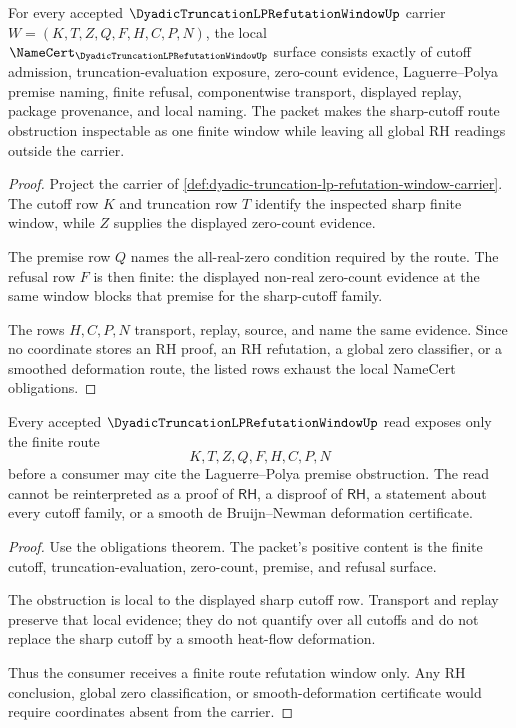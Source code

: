 \begin{theorem}
\label{thm:dyadic-truncation-lp-refutation-window-obligations}
For every accepted $\DyadicTruncationLPRefutationWindowUp$ carrier $W=(K,T,Z,Q,F,H,C,P,N)$, the local $\NameCert_{\DyadicTruncationLPRefutationWindowUp}$ surface consists exactly of cutoff admission, truncation-evaluation exposure, zero-count evidence, Laguerre--Polya premise naming, finite refusal, componentwise transport, displayed replay, package provenance, and local naming. The packet makes the sharp-cutoff route obstruction inspectable as one finite window while leaving all global RH readings outside the carrier.
\end{theorem}
\begin{proof}
Project the carrier of \autoref{def:dyadic-truncation-lp-refutation-window-carrier}. The cutoff row $K$ and truncation row $T$ identify the inspected sharp finite window, while $Z$ supplies the displayed zero-count evidence.

The premise row $Q$ names the all-real-zero condition required by the route. The refusal row $F$ is then finite: the displayed non-real zero-count evidence at the same window blocks that premise for the sharp-cutoff family.

The rows $H,C,P,N$ transport, replay, source, and name the same evidence. Since no coordinate stores an RH proof, an RH refutation, a global zero classifier, or a smoothed deformation route, the listed rows exhaust the local NameCert obligations.
\end{proof}

\begin{theorem}
\label{thm:dyadic-truncation-lp-refutation-window-nonclaim-boundary}
Every accepted $\DyadicTruncationLPRefutationWindowUp$ read exposes only the finite route
$$
K,T,Z,Q,F,H,C,P,N
$$
before a consumer may cite the Laguerre--Polya premise obstruction. The read cannot be reinterpreted as a proof of $\mathsf{RH}$, a disproof of $\mathsf{RH}$, a statement about every cutoff family, or a smooth de Bruijn--Newman deformation certificate.
\end{theorem}
\begin{proof}
Use the obligations theorem. The packet's positive content is the finite cutoff, truncation-evaluation, zero-count, premise, and refusal surface.

The obstruction is local to the displayed sharp cutoff row. Transport and replay preserve that local evidence; they do not quantify over all cutoffs and do not replace the sharp cutoff by a smooth heat-flow deformation.

Thus the consumer receives a finite route refutation window only. Any RH conclusion, global zero classification, or smooth-deformation certificate would require coordinates absent from the carrier.
\end{proof}

